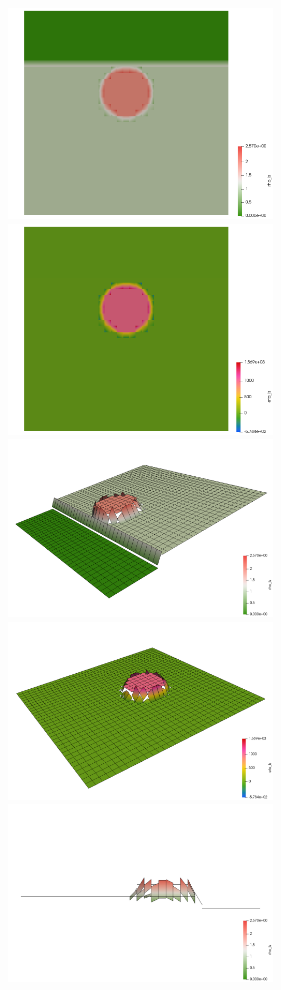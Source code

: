 \begin{center}
\includegraphics[width=7cm]{python_codes/fieldstone_41/results/exp3/rho_ls}
\includegraphics[width=7cm]{python_codes/fieldstone_41/results/exp3/eta_ls}\\
\includegraphics[width=7cm]{python_codes/fieldstone_41/results/exp3/rho_ls_warp}
\includegraphics[width=7cm]{python_codes/fieldstone_41/results/exp3/eta_ls_warp}\\
\includegraphics[width=7cm]{python_codes/fieldstone_41/results/exp3/rho_ls_warp2}

\end{center}
